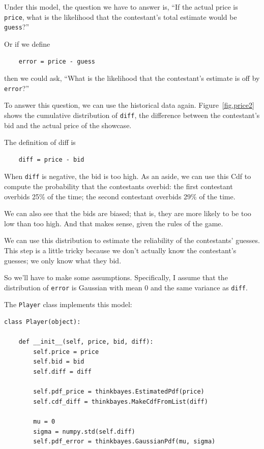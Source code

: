 \documentclass[12pt]{book}
\begin{document}
Under this model, the question we have to answer is, ``If the
actual price is {\tt price}, what is the likelihood that the
contestant's total estimate would be {\tt guess}?''

Or if we define
%
\begin{verbatim}
    error = price - guess
\end{verbatim}
%
then we could ask, ``What is the likelihood
that the contestant's estimate is off by {\tt error}?''

To answer this question, we can use the historical data again.
Figure~\ref{fig.price2} shows the cumulative distribution of {\tt diff},
the difference between the contestant's bid and the actual price
of the showcase.

The definition of diff is
%
\begin{verbatim}
    diff = price - bid
\end{verbatim}
%
When {\tt diff} is negative, the bid is too high.  As an
aside, we can use this Cdf to compute the probability that the
contestants overbid: the first contestant overbids 25\% of the
time; the second contestant overbids 29\% of the time.

We can also see that the bids are biased;
that is, they are more likely to be too low than too high.  And
that makes sense, given the rules of the game.

We can use this distribution to estimate the reliability of
the contestants' guesses.  This step is a little tricky because
we don't actually know the contestant's guesses; we only know
what they bid.

So we'll have to make some assumptions.  Specifically, I
assume that the distribution of {\tt error} is Gaussian with mean 0
and the same variance as {\tt diff}.

The {\tt Player} class implements this model:

\begin{verbatim}
class Player(object):

    def __init__(self, price, bid, diff):
        self.price = price
        self.bid = bid
        self.diff = diff

        self.pdf_price = thinkbayes.EstimatedPdf(price)
        self.cdf_diff = thinkbayes.MakeCdfFromList(diff)

        mu = 0
        sigma = numpy.std(self.diff)
        self.pdf_error = thinkbayes.GaussianPdf(mu, sigma)
\end{verbatim}
\end{document}
